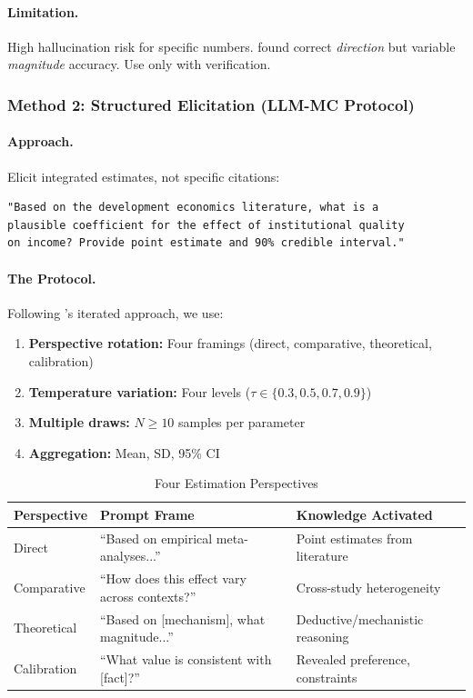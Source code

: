 \paragraph{Limitation.}
High hallucination risk for specific numbers. \citet{llmpriors2025scientific} found correct \textit{direction} but variable \textit{magnitude} accuracy. Use only with verification.

\subsubsection{Method 2: Structured Elicitation (LLM-MC Protocol)}

\paragraph{Approach.}
Elicit integrated estimates, not specific citations:

\begin{verbatim}
"Based on the development economics literature, what is a 
plausible coefficient for the effect of institutional quality 
on income? Provide point estimate and 90% credible interval."
\end{verbatim}

\paragraph{The Protocol.}
Following \citet{zhu2024eliciting}'s iterated approach, we use:
\begin{enumerate}
    \item \textbf{Perspective rotation:} Four framings (direct, comparative, theoretical, calibration)
    \item \textbf{Temperature variation:} Four levels ($\tau \in \{0.3, 0.5, 0.7, 0.9\}$)
    \item \textbf{Multiple draws:} $N \geq 10$ samples per parameter
    \item \textbf{Aggregation:} Mean, SD, 95\% CI
\end{enumerate}

\begin{table}[htbp]
\centering
\caption{Four Estimation Perspectives}
\label{tab:perspectives}
\small
\begin{tabular}{@{}p{2.2cm}p{4.5cm}p{4.5cm}@{}}
\toprule
\textbf{Perspective} & \textbf{Prompt Frame} & \textbf{Knowledge Activated} \\
\midrule
Direct & ``Based on empirical meta-analyses...'' & Point estimates from literature \\
Comparative & ``How does this effect vary across contexts?'' & Cross-study heterogeneity \\
Theoretical & ``Based on [mechanism], what magnitude...'' & Deductive/mechanistic reasoning \\
Calibration & ``What value is consistent with [fact]?'' & Revealed preference, constraints \\
\bottomrule
\end{tabular}
\end{table}

